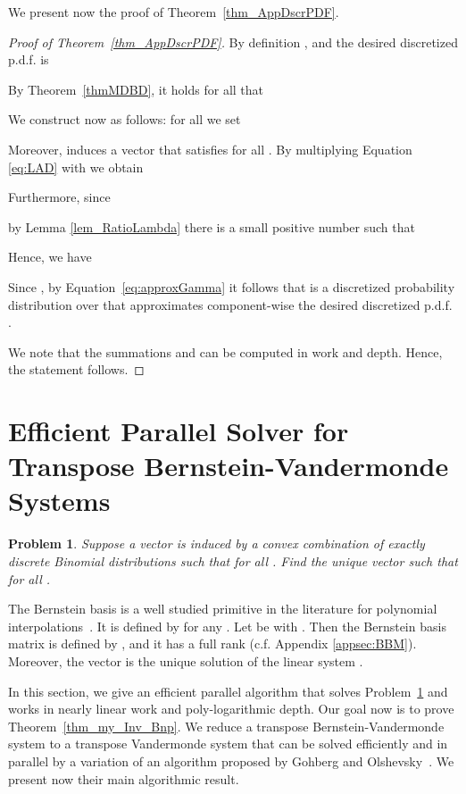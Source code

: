 \documentclass[11pt]{article}
\newtheorem{problem}{Problem}
\numberwithin{thm}{section}
\begin{document}
We present now the proof of Theorem~\ref{thm_AppDscrPDF}.

\begin{proof}[Proof of Theorem~\ref{thm_AppDscrPDF}]
By definition ,  and the desired discretized p.d.f. is

By Theorem~\ref{thmMDBD}, it holds for all  that

We construct now   as follows: for all  we set

Moreover,  induces a vector  that satisfies  for all . By multiplying Equation \ref{eq:LAD} with  we obtain

Furthermore, since

by Lemma \ref{lem_RatioLambda} there is a small positive number 
such that

Hence, we have

Since , by Equation~\ref{eq:approxGamma} it follows that  is a discretized probability distribution over  that approximates component-wise the desired discretized p.d.f. .

We note that the summations  and  can be computed in  work and  depth. Hence, the statement follows.
\end{proof}


\section{Efficient Parallel Solver for Transpose Bernstein-Vandermonde Systems}\label{sec:StBVls}

\begin{problem}\label{prob_ExN_Bnk}
Suppose a vector  is
induced by a convex combination of exactly  discrete Binomial
distributions  such that  for all .
Find the unique vector  such that 
for all .
\end{problem}

The Bernstein basis is a well studied primitive in the literature for polynomial interpolations~\cite{UN03,CUN02}. It is defined by 
for any . Let  be  with . Then the Bernstein basis matrix is defined by , and it has a full rank (c.f. Appendix \ref{appsec:BBM}). Moreover, the vector  is the unique solution of the linear system .


In this section, we give an efficient parallel algorithm that solves Problem~\ref{prob_ExN_Bnk} and works in nearly linear work and poly-logarithmic depth. Our goal now is to prove Theorem~\ref{thm_my_Inv_Bnp}. We reduce a transpose Bernstein-Vandermonde system to a transpose Vandermonde system that can be solved efficiently and in parallel by a variation of an algorithm proposed by Gohberg and Olshevsky~\cite{GO94}. We present now their main algorithmic result.
\end{document}
